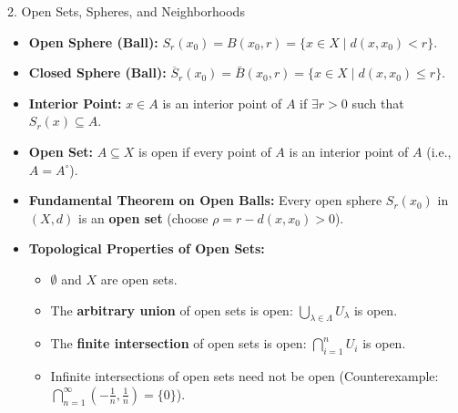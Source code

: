 \documentclass[11pt,a4paper]{article}
\begin{document}
\begin{defbox}{2. Open Sets, Spheres, and Neighborhoods}
\begin{itemize}
    \item \textbf{Open Sphere (Ball):} $S_r(x_0) = B(x_0, r) = \{x \in X \mid d(x, x_0) < r\}$.
    \item \textbf{Closed Sphere (Ball):} $\overline{S}_r(x_0) = \bar{B}(x_0, r) = \{x \in X \mid d(x, x_0) \le r\}$.
    \item \textbf{Interior Point:} $x \in A$ is an interior point of $A$ if $\exists r > 0$ such that $S_r(x) \subseteq A$.
    \item \textbf{Open Set:} $A \subseteq X$ is open if every point of $A$ is an interior point of $A$ (i.e., $A = A^\circ$).
    \item \textbf{Fundamental Theorem on Open Balls:} Every open sphere $S_r(x_0)$ in $(X, d)$ is an \textbf{open set} (choose $\rho = r - d(x, x_0) > 0$).
    \item \textbf{Topological Properties of Open Sets:}
    \begin{itemize}
        \item $\emptyset$ and $X$ are open sets.
        \item The \textbf{arbitrary union} of open sets is open: $\bigcup_{\lambda \in \Lambda} U_\lambda$ is open.
        \item The \textbf{finite intersection} of open sets is open: $\bigcap_{i=1}^n U_i$ is open.
        \item Infinite intersections of open sets need not be open (Counterexample: $\bigcap_{n=1}^\infty \left(-\frac{1}{n}, \frac{1}{n}\right) = \{0\}$).
    \end{itemize}
\end{itemize}
\end{defbox}

\newpage
\end{document}
